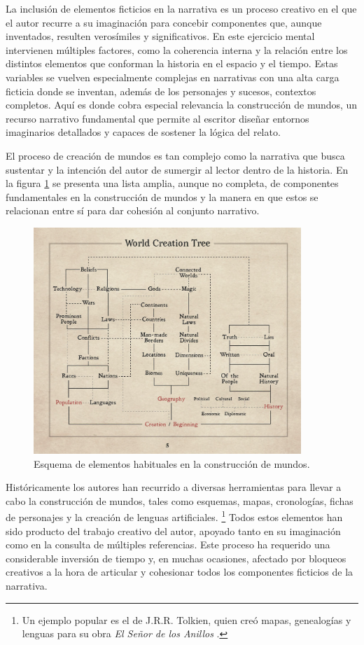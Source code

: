 La inclusión de elementos ficticios en la narrativa es un proceso creativo
en el que el autor recurre a su imaginación para concebir componentes que, aunque inventados,
resulten verosímiles y significativos.
En este ejercicio mental intervienen múltiples factores, como la coherencia interna y la relación 
entre los distintos elementos que conforman la historia en el espacio y el tiempo.
Estas variables se vuelven especialmente complejas en narrativas con una alta carga ficticia
donde se inventan, además de los personajes y sucesos, contextos completos.
Aquí es donde cobra especial relevancia la construcción de mundos, un recurso narrativo fundamental que permite
al escritor diseñar entornos imaginarios detallados y capaces de sostener la lógica del relato.

El proceso de creación de mundos es tan complejo como la narrativa que busca sustentar y
la intención del autor de sumergir al lector dentro de la historia.
En la figura \ref{fig:worldBuildingElements} se presenta una lista amplia, aunque no completa,
de componentes fundamentales en la construcción de mundos 
y la manera en que estos se relacionan entre sí para dar cohesión al conjunto narrativo.

\begin{figure}[htbp]
	\centering
	\includegraphics[width=0.9\textwidth]{./Figures/world-building-elements.png}
	\caption{Esquema de elementos habituales en la construcción de mundos.}
	\label{fig:worldBuildingElements}
\end{figure}

Históricamente los autores han recurrido a diversas herramientas para llevar a cabo la construcción de mundos,
tales como esquemas, mapas, cronologías, fichas de personajes y la creación de lenguas artificiales.
\footnote{Un ejemplo popular es el de J.R.R. Tolkien, quien creó mapas, genealogías y lenguas para su obra
\textit{El Señor de los Anillos} \cite{tolkien_letters}.}
Todos estos elementos han sido producto del trabajo creativo del autor, apoyado tanto en su imaginación como en la
consulta de múltiples referencias.
Este proceso ha requerido una considerable inversión de tiempo y, en muchas ocasiones,
afectado por bloqueos creativos a la hora de articular y cohesionar todos los componentes ficticios de la narrativa.


